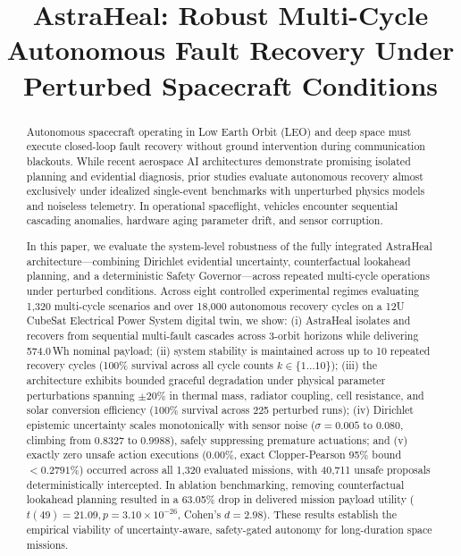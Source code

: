 \documentclass[conference]{IEEEtran}
\title{AstraHeal: Robust Multi-Cycle Autonomous Fault Recovery Under Perturbed Spacecraft Conditions}
\author{
\IEEEauthorblockN{Madan Kalyan Thambisetty}
\IEEEauthorblockA{
Autonomous Systems \& Aerospace Software Research Group\\
AstraHeal Space Research Series --- Paper 4 --- Formal Capstone\\
Open-Source Repository: \url{https://github.com/madankalyan2211/AstraHeal}
}
}
\begin{document}
\setlength{\parindent}{0pt}
\setlength{\parskip}{3.5pt plus 1pt minus 1pt}

\maketitle

\begin{abstract}
Autonomous spacecraft operating in Low Earth Orbit (LEO) and deep space must execute closed-loop fault recovery without ground intervention during communication blackouts. While recent aerospace AI architectures demonstrate promising isolated planning and evidential diagnosis, prior studies evaluate autonomous recovery almost exclusively under idealized single-event benchmarks with unperturbed physics models and noiseless telemetry. In operational spaceflight, vehicles encounter sequential cascading anomalies, hardware aging parameter drift, and sensor corruption.

In this paper, we evaluate the system-level robustness of the fully integrated AstraHeal architecture---combining Dirichlet evidential uncertainty, counterfactual lookahead planning, and a deterministic Safety Governor---across repeated multi-cycle operations under perturbed conditions. Across eight controlled experimental regimes evaluating 1,320 multi-cycle scenarios and over 18,000 autonomous recovery cycles on a 12U CubeSat Electrical Power System digital twin, we show: (i) AstraHeal isolates and recovers from sequential multi-fault cascades across 3-orbit horizons while delivering 574.0\,Wh nominal payload; (ii) system stability is maintained across up to 10 repeated recovery cycles (100\% survival across all cycle counts $k \in \{1 \dots 10\}$); (iii) the architecture exhibits bounded graceful degradation under physical parameter perturbations spanning $\pm 20\%$ in thermal mass, radiator coupling, cell resistance, and solar conversion efficiency (100\% survival across 225 perturbed runs); (iv) Dirichlet epistemic uncertainty scales monotonically with sensor noise ($\sigma = 0.005$ to $0.080$, climbing from $0.8327$ to $0.9988$), safely suppressing premature actuations; and (v) exactly zero unsafe action executions ($0.00\%$, exact Clopper-Pearson 95\% bound $< 0.2791\%$) occurred across all 1,320 evaluated missions, with 40,711 unsafe proposals deterministically intercepted. In ablation benchmarking, removing counterfactual lookahead planning resulted in a 63.05\% drop in delivered mission payload utility ($t(49) = 21.09, p = 3.10 \times 10^{-26}$, Cohen's $d = 2.98$). These results establish the empirical viability of uncertainty-aware, safety-gated autonomy for long-duration space missions.
\end{abstract}
\end{document}
